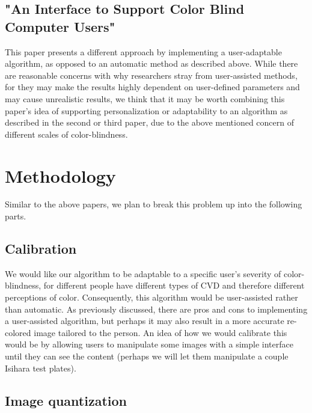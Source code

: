 \documentclass[10pt,twocolumn,letterpaper]{article}
\begin{document}
\subsection{"An Interface to Support Color Blind Computer Users"}

This paper presents a different approach by implementing a user-adaptable algorithm, as opposed to an automatic method as described above. While there are reasonable concerns with why researchers stray from user-assisted methods, for they may make the results highly dependent on user-defined parameters and may cause unrealistic results, we think that it may be worth combining this paper’s idea of supporting personalization or adaptability to an algorithm as described in the second or third paper, due to the above mentioned concern of different scales of color-blindness. 


\section{Methodology}

Similar to the above papers, we plan to break this problem up into the following parts.

\subsection{Calibration}

We would like our algorithm to be adaptable to a specific user’s severity of color-blindness, for different people have different types of CVD and therefore different perceptions of color. Consequently, this algorithm would be user-assisted rather than automatic. As previously discussed, there are pros and cons to implementing a user-assisted algorithm, but perhaps it may also result in a more accurate re-colored image tailored to the person. An idea of how we would calibrate this would be by allowing users to manipulate some images with a simple interface until they can see the content (perhaps we will let them manipulate a couple Isihara test plates). 

\subsection{Image quantization}
\end{document}
